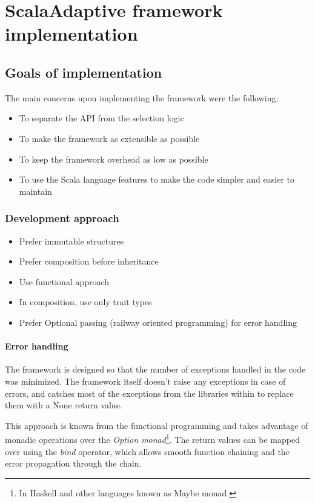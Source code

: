 \chapter{ScalaAdaptive framework implementation}

\section{Goals of implementation}

The main concerns upon implementing the framework were the following:

\begin{itemize}
	\item To separate the API from the selection logic
	\item To make the framework as extensible as possible
	\item To keep the framework overhead as low as possible
	\item To use the Scala language features to make the code simpler and easier to maintain
\end{itemize}

\subsection{Development approach}

\begin{itemize}
	\item Prefer immutable structures
	\item Prefer composition before inheritance
	\item Use functional approach
	\item In composition, use only trait types
	\item Prefer Optional passing (railway oriented programming) for error handling
\end{itemize}

\subsubsection{Error handling}

The framework is designed so that the number of exceptions handled in the code was minimized. The framework itself doesn't raise any exceptions in case of errors, and catches most of the exceptions from the libraries within to replace them with a None return value.

This approach is known from the functional programming and takes advantage of monadic operations over the \textit{Option monad}\footnote{In Haskell and other languages known as Maybe monad.}. The return values can be mapped over using the \textit{bind} operator, which allows smooth function chaining and the error propagation through the chain.

